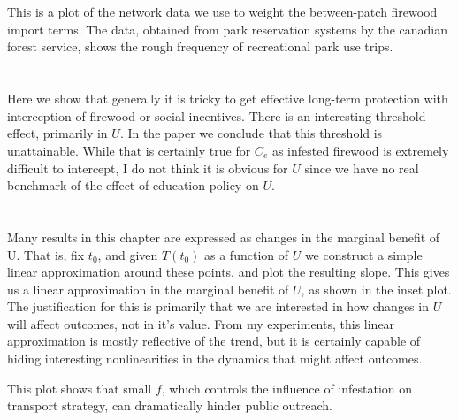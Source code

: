 \documentclass{article}
\begin{document}
\section{}

This is a plot of the network data we use to weight the between-patch firewood import terms. The data, obtained from park reservation systems by the canadian forest service, shows the rough frequency of recreational park use trips.

\section{}

Here we show that generally it is tricky to get effective long-term protection with interception of firewood or social incentives. There is an interesting threshold effect, primarily in $U$. In the paper we conclude that this threshold is unattainable. While that is certainly true for $C_e$ as infested firewood is extremely difficult to intercept, I do not think it is obvious for $U$ since we have no real benchmark of the effect of education policy on $U$.



\section{}

Many results in this chapter are expressed as changes in the marginal benefit of U. That is, fix $t_0$, and given $T(t_0)$ as a function of $U$ we construct a simple linear approximation around these points, and plot the resulting slope. This gives us a linear approximation in the marginal benefit of $U$, as shown in the inset plot. The justification for this is primarily that we are interested in how changes in $U$ will affect outcomes, not in it's value. From my experiments, this linear approximation is mostly reflective of the trend, but it is certainly capable of hiding interesting nonlinearities in the dynamics that might affect outcomes.  

This plot shows that small $f$, which controls the influence of infestation on transport strategy, can dramatically hinder public outreach.

\section{}
\end{document}
